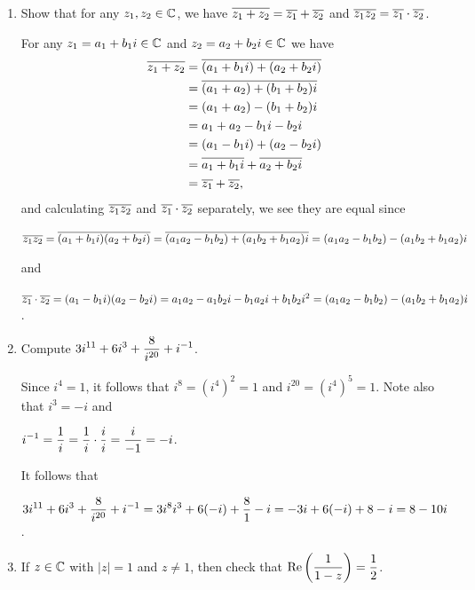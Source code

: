 \documentclass[11pt,fleqn,dvipsnames,usenames]{article}
\begin{document}
\begin{enumerate}
\item Show that for any $z_{1},z_{2}\in\mathbb{C}$, we have $\overline{z_{1} + z_{2}} = \overline{z_{1}} + \overline{z_{2}}$ and $\overline{z_{1}z_{2}} = \overline{z_{1}}\cdot\overline{z_{2}}$.
\vsmsp

\solution For any $z_{1} = a_{1}+b_{1}i\in\mathbb{C}$ and $z_{2} = a_{2} +b_{2}i\in\mathbb{C}$ we have
\begin{align*}
\overline{z_{1} + z_{2}} &= \overline{(a_{1} + b_{1}i) + (a_{2} + b_{2}i)}\\
&= \overline{(a_{1} + a_{2}) + (b_{1} + b_{2})i}\\
&= (a_{1} + a_{2}) - (b_{1} + b_{2})i\\
&= a_{1} + a_{2} - b_{1}i - b_{2}i\\
&= (a_{1} - b_{1}i) + (a_{2} - b_{2}i)\\
&= \overline{a_{1} + b_{1}i} + \overline{a_{2} + b_{2}i}\\
&= \overline{z_{1}} + \overline{z_{2}},
\end{align*}
and calculating $\overline{z_{1}z_{2}}$ and $\overline{z_{1}}\cdot\overline{z_{2}}$ separately, we see they are equal since
\begin{center}
$\overline{z_{1}z_{2}} = \overline{(a_{1} + b_{1}i)(a_{2} + b_{2}i)} = \overline{(a_{1}a_{2} - b_{1}b_{2}) + (a_{1}b_{2} + b_{1}a_{2})i} = (a_{1}a_{2} - b_{1}b_{2}) - (a_{1}b_{2} + b_{1}a_{2})i$
\end{center}
and
\begin{center}
$\overline{z_{1}}\cdot\overline{z_{2}} = (a_{1}-b_{1}i)(a_{2}-b_{2}i) = a_{1}a_{2} - a_{1}b_{2}i - b_{1}a_{2}i + b_{1}b_{2}i^2 = (a_{1}a_{2} - b_{1}b_{2}) - (a_{1}b_{2} + b_{1}a_{2})i$.
\end{center}
\item Compute $\displaystyle{3i^{11} + 6i^{3} + \frac{8}{i^{20}} + i^{-1}}$.
\vsmsp

\solution Since $i^{4} = 1$, it follows that $i^{8} = (i^4)^2 = 1$ and $i^{20} = (i^4)^5 = 1$.  Note also that $i^3 = -i$ and
\begin{center}
$\displaystyle{i^{-1} = \frac{1}{i} = \frac{1}{i}\cdot \frac{i}{i} = \frac{i}{-1} = -i}$.
\end{center}
It follows that
\begin{center}
$\displaystyle{3i^{11} + 6i^{3} + \frac{8}{i^{20}} + i^{-1}} = \displaystyle{3i^{8}i^{3} + 6(-i) + \frac{8}{1} - i} = \displaystyle{-3i + 6(-i) + 8 - i} = \displaystyle{8 -10i}$.
\end{center}

\item If $z\in\mathbb{C}$ with $|z| = 1$ and $z\neq 1$, then check that $\text{Re}\left(\dfrac{1}{1-z}\right) = \dfrac{1}{2}$.
\vsmsp


\end{enumerate}
\end{document}
